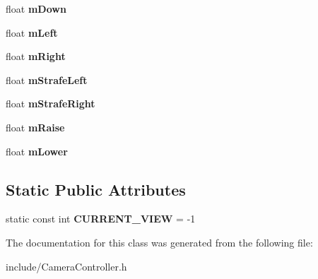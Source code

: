 \begin{DoxyCompactItemize}
\item 
\hypertarget{class_camera_controller_a8677b055ef9a773d4dae4b688bbbaa51}{
float {\bfseries mDown}}
\label{class_camera_controller_a8677b055ef9a773d4dae4b688bbbaa51}

\item 
\hypertarget{class_camera_controller_a4734d5ada8a0ea6431b588b0b233c866}{
float {\bfseries mLeft}}
\label{class_camera_controller_a4734d5ada8a0ea6431b588b0b233c866}

\item 
\hypertarget{class_camera_controller_a68f3e624a3219c884a62667652fb7ee1}{
float {\bfseries mRight}}
\label{class_camera_controller_a68f3e624a3219c884a62667652fb7ee1}

\item 
\hypertarget{class_camera_controller_a93b3c5f42b79984db26fa06f19888d09}{
float {\bfseries mStrafeLeft}}
\label{class_camera_controller_a93b3c5f42b79984db26fa06f19888d09}

\item 
\hypertarget{class_camera_controller_af90637e0f3dbfe0c01bdaea064cf3510}{
float {\bfseries mStrafeRight}}
\label{class_camera_controller_af90637e0f3dbfe0c01bdaea064cf3510}

\item 
\hypertarget{class_camera_controller_adaf051573f75ada6202a2345e104694f}{
float {\bfseries mRaise}}
\label{class_camera_controller_adaf051573f75ada6202a2345e104694f}

\item 
\hypertarget{class_camera_controller_a5df04281679c5df5fbc054920b932f9d}{
float {\bfseries mLower}}
\label{class_camera_controller_a5df04281679c5df5fbc054920b932f9d}

\end{DoxyCompactItemize}
\subsection*{Static Public Attributes}
\begin{DoxyCompactItemize}
\item 
\hypertarget{class_camera_controller_a99cd8a250c84f5b93b32c8285d02aff1}{
static const int {\bfseries CURRENT\_\-VIEW} = -\/1}
\label{class_camera_controller_a99cd8a250c84f5b93b32c8285d02aff1}

\end{DoxyCompactItemize}


The documentation for this class was generated from the following file:\begin{DoxyCompactItemize}
\item 
include/CameraController.h\end{DoxyCompactItemize}
